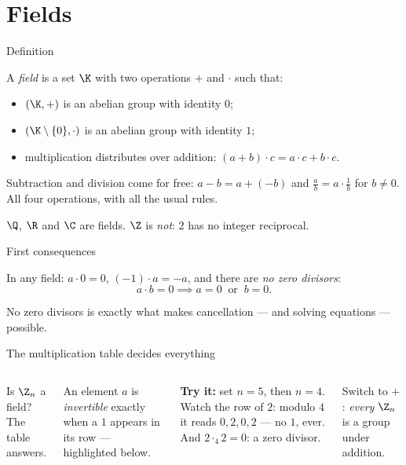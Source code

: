 \section{Fields}

\begin{frame}{Definition}
\begin{definition}
A \emph{field} is a set $\K$ with two operations $+$ and $\cdot$ such that:
\begin{itemize}
\item $(\K, +)$ is an abelian group with identity $0$;
\item $(\K \setminus \{0\}, \cdot)$ is an abelian group with identity $1$;
\item multiplication distributes over addition: $(a+b)\cdot c = a\cdot c + b\cdot c$.
\end{itemize}
\end{definition}

\pause

Subtraction and division come for free: $a - b = a + (-b)$ and
$\tfrac{a}{b} = a \cdot \tfrac1b$ for $b \neq 0$. All four operations,
with all the usual rules.

\pause

\begin{example}
$\Q$, $\R$ and $\C$ are fields. $\Z$ is \emph{not}: $2$ has no integer
reciprocal.
\end{example}
\end{frame}

\begin{frame}{First consequences}
\begin{fact}
In any field: $a \cdot 0 = 0$, \quad $(-1)\cdot a = -a$, \quad and there are
\emph{no zero divisors}:
\[
a \cdot b = 0 \implies a = 0 \ \text{ or } \ b = 0.
\]
\end{fact}

\pause

\begin{steps}
\end{steps}

\pause

No zero divisors is exactly what makes cancellation — and solving
equations — possible.
\end{frame}

\begin{frame}{The multiplication table decides everything}
\begin{columns}
\column
Is $\Z_n$ a field? The table answers.

An element $a$ is \emph{invertible} exactly when a $1$ appears in its row —
highlighted below.

\textbf{Try it:} set $n = 5$, then $n = 4$. Watch the row of $2$: modulo $4$
it reads $0, 2, 0, 2$ — no $1$, ever. And $2 \cdot_4 2 = 0$: a zero divisor.

Switch to $+$: \emph{every} $\Z_n$ is a group under addition.
\column
{}
\end{columns}
\end{frame}

